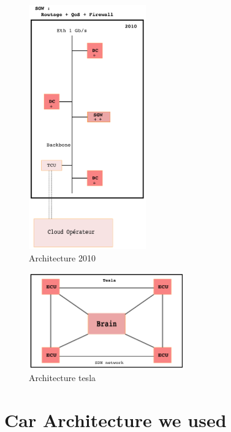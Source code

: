 \begin{figure}[h]
    \centering
	\includegraphics[width=0.45\textwidth]{schema/architecture/2010.pdf}
    \caption{Architecture 2010}
    \label{2010_archi}
\end{figure}

\begin{figure}[h]
    \centering
	\includegraphics[width=0.6\textwidth]{schema/architecture/tesla.pdf}
    \caption{Architecture tesla}
    \label{tesla_archi}
\end{figure}



\section {Car Architecture we used}

